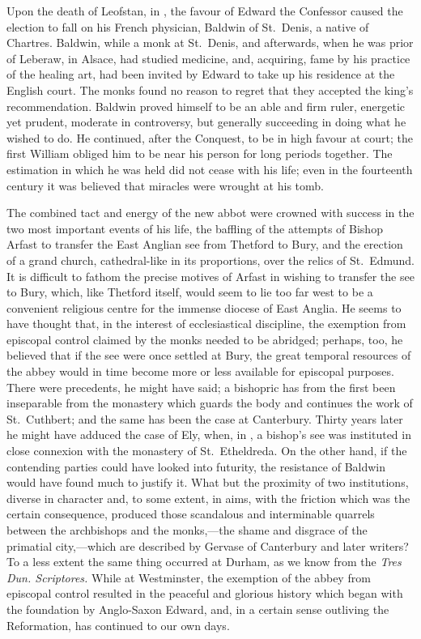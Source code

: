 \documentclass[10pt]{book}
\begin{document}
{Upon the death of Leofstan, in , the favour of Edward the Confessor caused the election to fall on his French physician, Baldwin of St.\ Denis, a native of Chartres. Baldwin, while a monk at St.\ Denis, and afterwards, when he was prior of Leberaw, in Alsace, had studied medicine, and, acquiring, fame by his practice of the healing art, had been invited by Edward to take up his residence at the English court. The monks found no reason to regret that they accepted the king's recommendation. Baldwin proved himself to be an able and firm ruler, energetic yet prudent, moderate in controversy, but generally succeeding in doing what he wished to do. He continued, after the Conquest, to be in high favour at court; the first William obliged him to be near his person for long periods together. The estimation in which he was held did not cease with his life; even in the fourteenth century it was believed that miracles were wrought at his tomb.

The combined tact and energy of the new abbot were crowned with success in the two most important events of his life, the baffling of the attempts of Bishop Arfast to transfer the East Anglian see from Thetford to Bury, and the erection of a grand church, cathedral-like in its proportions, over the relics of St.\ Edmund. It is difficult to fathom the precise motives of Arfast in wishing to transfer the see to Bury, which, like Thetford itself, would seem to lie too far west to be a convenient religious centre for the immense diocese of East Anglia. He seems to have thought that, in the interest of ecclesiastical discipline, the exemption from episcopal control claimed by the monks needed to be abridged; perhaps, too, he believed that if the see were once settled at Bury, the great temporal resources of the abbey would in time become more or less available for episcopal purposes. There were precedents, he might have said; a bishopric has from the first been inseparable from the monastery which guards the body and continues the work of St.\ Cuthbert; and the same has been the case at Canterbury. Thirty years later he might have adduced the case of Ely, when, in , a bishop's see was instituted in close connexion with the monastery of St.\ Etheldreda. On the other hand, if the contending parties could have looked into futurity, the resistance of Baldwin would have found much to justify it. What but the proximity of two institutions, diverse in character and, to some extent, in aims, with the friction which was the certain consequence, produced those scandalous and interminable quarrels between the archbishops and the monks,---the shame and disgrace of the primatial city,---which are described by Gervase of Canterbury and later writers? To a less extent the same thing occurred at Durham, as we know from the \emph{Tres Dun. Scriptores.} While at Westminster, the exemption of the abbey from episcopal control resulted in the peaceful and glorious history which began with the foundation by Anglo-Saxon Edward, and, in a certain sense outliving the Reformation, has continued to our own days.

}
\end{document}
